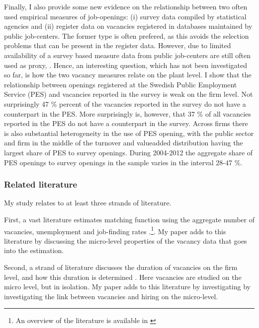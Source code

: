 Finally, I also provide some new evidence on the relationship between two often used empirical measures of job-openings: (i) survey data compiled by statistical agencies and (ii) register data on vacancies registered in databases maintained by public job-centers. The former type is often prefered, as this avoids the selection problems that can be present in the register data. However, due to limited availability of a survey based measure data from public job-centers are still often used as proxy, \citep{Berman1997, Carlsson2013, Hansen2004,  Wall2002, Yashiv2000}. Hence, an interesting question, which has not been investigated so far, is how the two vacancy measures relate on the plant level. I show that the relationship between openings registered at the Swedish Public Employment Service (PES) and vacancies reported in the survey is weak on the firm level. Not surprisingly 47 \% percent of the vacancies reported in the survey do not have a counterpart in the PES. More surprisingly is, however, that 37 \% of all vacancies reported in the PES do not have a counterpart in the survey. Across firms there is also substantial heterogeneity in the use of PES opening, with the public sector and firm in the middle of the turnover and valueadded distribution having the largest share of PES to survey openings. During 2004-2012 the aggregate share of PES openings to survey openings in the sample varies in the interval 28-47 \%.

\subsubsection{Related literature}

My study relates to at least three strands of literature. 

First, a vast literature estimates matching function using the aggregate number of vacancies, unemployment and job-finding rates \citep{Blanchard1990, Berman1997, Yashiv2000, Hansen2004, Sunde2007, Gross1997, Entorf1998, Feve1996}.\footnote{An overview of the literature is available in \cite{Pissarides2000}}. My paper adds to this literature by discussing the micro-level properties of the vacancy data that goes into the estimation. 

Second, a strand of literature discusses the duration of vacancies on the firm level, and how this duration is determined \citep{Ours1991, Burdett1998, Barron1997, Holzer1990}. Here vacancies are studied on the micro level, but in isolation. My paper adds to this literature by investigating by investigating the link between vacancies and hiring on the micro-level. 

